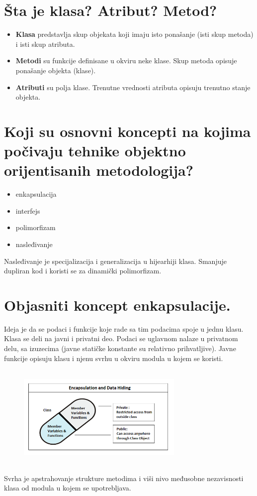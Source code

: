 \documentclass[a4paper]{article}
\begin{document}
\section{Šta je klasa? Atribut? Metod?}
  \begin{itemize}
    \item \textbf{Klasa} predstavlja skup objekata koji imaju isto ponašanje (isti skup metoda) 
          i isti skup atributa. 
    \item \textbf{Metodi} su funkcije definisane u okviru neke klase. 
          Skup metoda opisuje ponašanje objekta (klase). 
    \item \textbf{Atributi} su polja klase. Trenutne vrednosti atributa 
          opisuju trenutno stanje objekta. 
  \end{itemize}

\section{Koji su osnovni koncepti na kojima počivaju tehnike objektno orijentisanih metodologija?}
  \begin{itemize}
    \item enkapsulacija
    \item interfejs
    \item polimorfizam
    \item nasleđivanje
  \end{itemize}

  Nasleđivanje je specijalizacija i generalizacija u hijearhiji klasa. Smanjuje dupliran kod i
  koristi se za dinamički polimorfizam.

\section{Objasniti koncept enkapsulacije.}
  Ideja je da se podaci i funkcije koje rade sa tim podacima spoje u jednu klasu. Klasa se deli
  na javni i privatni deo. Podaci se uglavnom nalaze u privatnom delu, sa izuzecima (javne statičke 
  konstante su relativno prihvatljive). Javne funkcije opisuju klasu i njenu svrhu u okviru modula
  u kojem se koristi.
  \begin{figure}[H]
    \begin{center}
        \includegraphics[width=80mm,height=50mm]{Slike/encapsulation.png}
    \end{center}
  \end{figure}
  Svrha je apstrahovanje strukture metodima i viši nivo međusobne nezavisnosti klasa od modula u
  kojem se upotrebljava.
\end{document}
